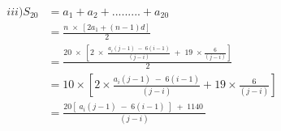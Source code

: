 \documentclass[journal, 12pt, twocolumn]{IEEEtran}
\begin{document}
    \begin{align*}
        iii)  S_{20} &= a_1 + a_2 + ......... + a_{20}\\
               &= \tfrac{n\;\times\;\left[2a_1 + (n-1)d\right]}{2} \\
               &= \tfrac{20\;\times\;\left[2\;\times\;\tfrac{a_i(j-1)\;-\;6(i-1)}{(j-i)}\; +\;19\;\times\tfrac{6}{(j-i)}\right]}{2} \\
               &= {10\times\left[2\times\tfrac{a_i(j-1)\;-\;6(i-1)}{(j-i)} +19\times\tfrac{6}{(j-i)}\right]} \\
               &= \tfrac{20\left[\;a_i(j-1)\;-\; 6(i-1)\;\right]\;+\;1140\;}{(j-i)} \\
\end{align*} 

    
    
\end{document}
